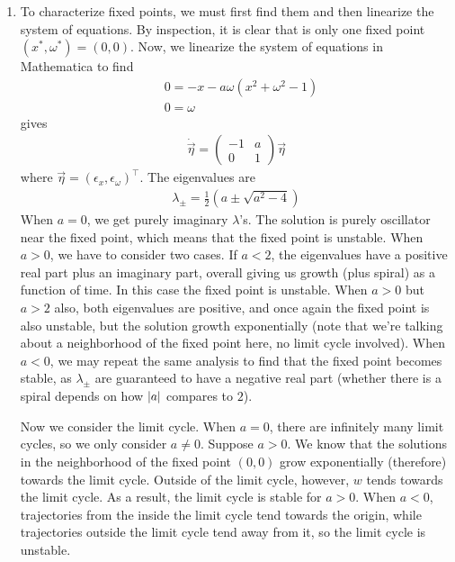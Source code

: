 \documentclass{article}
\theoremstyle{definition}
\newcommand{\f}[2]{\frac{#1}{#2}}
\newcommand{\lp}{\left(}
\newcommand{\rp}{\right)}
\begin{document}
\begin{enumerate}[label=(\alph*)]
	
	\item To characterize fixed points, we must first find them and then linearize the system of equations. By inspection, it is clear that is only one fixed point $(x^*, \omega^*) = (0,0)$. Now, we linearize the system of equations in Mathematica to find
	\begin{align*}
	&0 = -x - a \omega(x^2 + \omega^2 - 1)\\
	&0 = \omega
	\end{align*}
	gives
	\begin{align*}
	\dot{\vec{\eta}} = \begin{pmatrix}
	-1 & a \\ 0 & 1
	\end{pmatrix}\vec{\eta}
	\end{align*}
	where $\vec{\eta} = (\epsilon_x, \epsilon_\omega)^\top$. The eigenvalues are
	\begin{align*}
	\lambda_{\pm} = \f{1}{2}\lp a \pm \sqrt{a^2-4} \rp
	\end{align*}
	When $a=0$, we get purely imaginary $\lambda$'s. The solution is purely oscillator near the fixed point, which means that the fixed point is unstable. When $a>0$, we have to consider two cases. If $a<2$, the eigenvalues have a positive real part plus an imaginary part, overall giving us growth (plus spiral) as a function of time. In this case the fixed point is unstable. When $a>0$ but $a>2$ also, both eigenvalues are positive, and once again the fixed point is also unstable, but the solution growth exponentially (note that we're talking about a neighborhood of the fixed point here, no limit cycle involved). When $a<0$, we may repeat the same analysis to find that the fixed point becomes stable, as $\lambda_\pm$ are guaranteed to have a negative real part (whether there is a spiral depends on how $\abs{a}$ compares to $2$). 
	
	
	Now we consider the limit cycle. When $a=0$, there are infinitely many limit cycles, so we only consider $a\neq 0$. Suppose $a>0$.  We know that the solutions in the neighborhood of the fixed point $(0,0)$ grow exponentially (therefore) towards the limit cycle. Outside of the limit cycle, however, $w$ tends towards the limit cycle. As a result, the limit cycle is stable for $a>0$. When $a<0$, trajectories from the inside the limit cycle tend towards the origin, while trajectories outside the limit cycle tend away from it, so the limit cycle is unstable. 


\end{enumerate}
\end{document}
